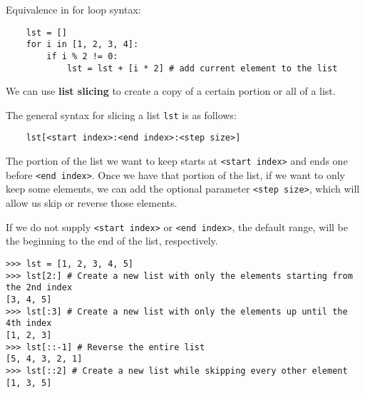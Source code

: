 Equivalence in for loop syntax:

\begin{lstlisting}
	lst = []
	for i in [1, 2, 3, 4]:
		if i % 2 != 0:
			lst = lst + [i * 2] # add current element to the list
\end{lstlisting}

We can use \textbf{list slicing} to create a copy of a certain portion or all of a list.

The general syntax for slicing a list \lstinline{lst} is as follows:

\begin{lstlisting}
	lst[<start index>:<end index>:<step size>]
\end{lstlisting}

The portion of the list we want to keep starts at \lstinline{<start index>} and ends one before
\lstinline{<end index>}. Once we have that portion of the list, if we want to only keep some elements, we can
add the optional parameter \lstinline{<step size>}, which will allow us skip or reverse those elements.

If we do not supply \lstinline{<start index>} or \lstinline{<end index>}, the default range, will be the
beginning to the end of the list, respectively. 

\begin{lstlisting}
>>> lst = [1, 2, 3, 4, 5]
>>> lst[2:] # Create a new list with only the elements starting from the 2nd index
[3, 4, 5]
>>> lst[:3] # Create a new list with only the elements up until the 4th index
[1, 2, 3]
>>> lst[::-1] # Reverse the entire list
[5, 4, 3, 2, 1]
>>> lst[::2] # Create a new list while skipping every other element
[1, 3, 5]
\end{lstlisting}

